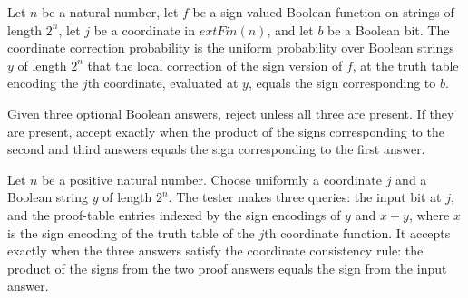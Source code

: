 \begin{definition}
\label{FABL.coordinateCorrectionProbability}
\leanok
{}
Let $n$ be a natural number, let $f$ be a sign-valued Boolean function on strings of
length $2^n$, let $j$ be a coordinate in $	ext{Fin}(n)$, and let $b$ be a Boolean bit.
The coordinate correction probability is the uniform probability over Boolean strings
$y$ of length $2^n$ that the local correction of the sign version of $f$, at the truth
table encoding the $j$th coordinate, evaluated at $y$, equals the sign corresponding to
$b$.
\end{definition}

\begin{definition}
\label{FABL.coordinateConsistencyTranscriptAccept}
\leanok
{}
Given three optional Boolean answers, reject unless all three are present. If they are
present, accept exactly when the product of the signs corresponding to the second and
third answers equals the sign corresponding to the first answer.
\end{definition}

\begin{definition}
\label{FABL.coordinateConsistencyFunctionTester}
\leanok
{}
Let $n$ be a positive natural number. Choose uniformly a coordinate $j$ and a Boolean
string $y$ of length $2^n$. The tester makes three queries: the input bit at $j$, and
the proof-table entries indexed by the sign encodings of $y$ and $x+y$, where $x$ is the
sign encoding of the truth table of the $j$th coordinate function. It accepts exactly
when the three answers satisfy the coordinate consistency rule: the product of the signs
from the two proof answers equals the sign from the input answer.
\end{definition}

